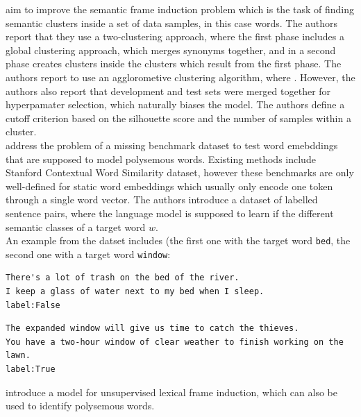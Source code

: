 \documentclass[a4paper,12pt,twoside,openright]{report}
\begin{document}
\cite{arefyev19} aim to improve the semantic frame induction problem which is the task of finding semantic clusters inside a set of data samples, in this case words.
The authors report that they use a two-clustering approach, where the first phase includes a global clustering approach, which merges synonyms together, and in a second phase creates clusters inside the clusters which result from the first phase.
The authors report to use an agglorometive clustering algorithm, where .
However, the authors also report that development and test sets were merged together for hyperpamater selection, which naturally biases the model.
The authors define a cutoff criterion based on the silhouette score and the number of samples within a cluster. \\

\cite{pilehvar19} address the problem of a missing benchmark dataset to test word emebddings that are supposed to model polysemous words.
Existing methods include Stanford Contextual Word Similarity dataset, however these benchmarks are only well-defined for static word embeddings which usually only encode one token through a single word vector.
The authors introduce a dataset of labelled sentence pairs, where the language model is supposed to learn if the different semantic classes of a target word $w$. \\

An example from the datset includes (the first one with the target word \Verb#bed#, the second one with a target word \Verb#window#:

\begin{verbatim}
There's a lot of trash on the bed of the river.
I keep a glass of water next to my bed when I sleep.
label:False
\end{verbatim}

\begin{verbatim}
The expanded window will give us time to catch the thieves.
You have a two-hour window of clear weather to finish working on the lawn.
label:True
\end{verbatim}


\cite{qasemizadeh19} introduce a model for unsupervised lexical frame induction, which can also be used to identify polysemous words.
\end{document}
